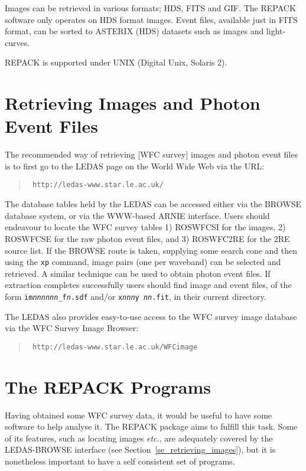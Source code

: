 Images can be retrieved in various formats; HDS, FITS and GIF. The
REPACK software only operates on HDS format images. Event files,
available just in FITS format, can be sorted to ASTERIX (HDS) datasets
such as images and light-curves.

REPACK is supported under UNIX (Digital Unix, Solaris 2).

\section{\label{se_retrieving_images}Retrieving Images and Photon Event Files}

The recommended  way of retrieving [\ro WFC survey] images and photon event
files is to first go to the LEDAS page on the World Wide Web via the URL:

\begin{quote}{\tt
{}%
{http://ledas-www.star.le.ac.uk/}}
\end{quote}

The database tables held by the LEDAS can be accessed either via the
BROWSE database system, or via the WWW-based ARNIE interface. Users
should endeavour to locate the \ro WFC survey tables 1) ROSWFCSI for
the images, 2) ROSWFCSE for the raw photon event files, and 3)
ROSWFC2RE for the 2RE source list.  If the BROWSE route is taken,
supplying some search cone and then using the {\tt xp} command, image
pairs (one per waveband) can be selected and retrieved.  A similar
technique can be used to obtain photon event files.  If extraction
completes successfully users should find image and event files, of the
form {\tt im{\it nnnnnn}\_f{\it n}.sdf} and/or {\tt x{\it nnn}y{\it
nn}.fit}, in their current directory.

The LEDAS also provides easy-to-use access to the WFC survey image
database via the WFC Survey Image Browser:

\begin{quote}{\tt
{}%
{http://ledas-www.star.le.ac.uk/WFCimage}}
\end{quote}

\section{\label{se_repack_programs}The REPACK Programs}

Having obtained some \ro WFC survey data, it would be useful to have some
software to help analyse it.  The REPACK package aims to fulfill this
task.  Some of its features, such as locating images \emph{etc.}, are
adequately covered by the LEDAS-BROWSE interface (see
Section~\ref{se_retrieving_images}), but it is nonetheless important to
have a self consistent set of programs.


